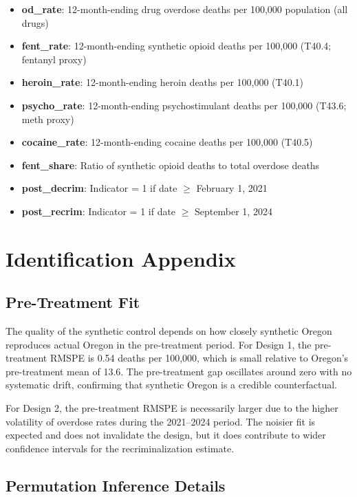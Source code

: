 \documentclass[12pt]{article}
\begin{document}
\begin{itemize}
    \item \textbf{od\_rate}: 12-month-ending drug overdose deaths per 100,000 population (all drugs)
    \item \textbf{fent\_rate}: 12-month-ending synthetic opioid deaths per 100,000 (T40.4; fentanyl proxy)
    \item \textbf{heroin\_rate}: 12-month-ending heroin deaths per 100,000 (T40.1)
    \item \textbf{psycho\_rate}: 12-month-ending psychostimulant deaths per 100,000 (T43.6; meth proxy)
    \item \textbf{cocaine\_rate}: 12-month-ending cocaine deaths per 100,000 (T40.5)
    \item \textbf{fent\_share}: Ratio of synthetic opioid deaths to total overdose deaths
    \item \textbf{post\_decrim}: Indicator = 1 if date $\geq$ February 1, 2021
    \item \textbf{post\_recrim}: Indicator = 1 if date $\geq$ September 1, 2024
\end{itemize}


\section{Identification Appendix}
\label{app:identification}

\subsection{Pre-Treatment Fit}

The quality of the synthetic control depends on how closely synthetic Oregon reproduces actual Oregon in the pre-treatment period. For Design 1, the pre-treatment RMSPE is 0.54 deaths per 100,000, which is small relative to Oregon's pre-treatment mean of 13.6. The pre-treatment gap oscillates around zero with no systematic drift, confirming that synthetic Oregon is a credible counterfactual.

For Design 2, the pre-treatment RMSPE is necessarily larger due to the higher volatility of overdose rates during the 2021--2024 period. The noisier fit is expected and does not invalidate the design, but it does contribute to wider confidence intervals for the recriminalization estimate.

\subsection{Permutation Inference Details}
\end{document}
